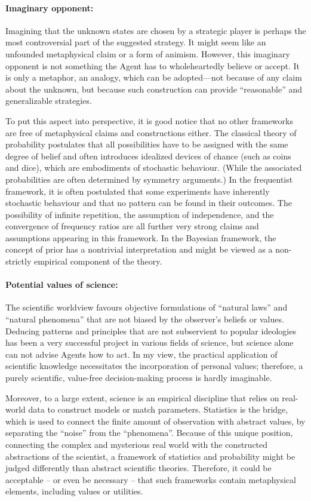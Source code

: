 \documentclass{article}
\begin{document}
\paragraph{Imaginary opponent:}
Imagining that the unknown states are chosen by a strategic player is perhaps the most controversial part of the suggested strategy. It might seem like an unfounded metaphysical claim or a form of animism. However, this imaginary opponent is not something the Agent has to wholeheartedly believe or accept. It is only a metaphor, an analogy, which can be adopted—not because of any claim about the unknown, but because such construction can provide ``reasonable'' and generalizable strategies.

To put this aspect into perspective, it is good notice that no other frameworks are free of metaphysical claims and constructions either.
The classical theory of probability postulates that all possibilities have to be assigned with the same degree of belief and often introduces idealized devices of chance (such as coins and dice), which are embodiments of stochastic behaviour. (While the associated probabilities are often determined by symmetry arguments.)
In the frequentist framework, it is often postulated that some experiments have inherently stochastic behaviour and that no pattern can be found in their outcomes. The possibility of infinite repetition, the assumption of independence, and the convergence of frequency ratios are all further very strong claims and assumptions appearing in this framework.
In the Bayesian framework, the concept of prior has a nontrivial interpretation and might be viewed as a non-strictly empirical component of the theory.

\paragraph{Potential values of science:}
The scientific worldview favours objective formulations of ``natural laws'' and ``natural phenomena'' that are not biased by the observer’s beliefs or values. Deducing patterns and principles that are not subservient to popular ideologies has been a very successful project in various fields of science, but science alone can not advise Agents how to act.
In my view, the practical application of scientific knowledge necessitates the incorporation of personal values; therefore, a purely scientific, value-free decision-making process is hardly imaginable.

Moreover, to a large extent, science is an empirical discipline that relies on real-world data to construct models or match parameters. Statistics is the bridge, which is used to connect the finite amount of observation with abstract values, by separating the ``noise'' from the ``phenomena''. Because of this unique position, connecting the complex and mysterious real world with the constructed abstractions of the scientist, a framework of statistics and probability might be judged differently than abstract scientific theories. Therefore, it could be acceptable – or even be necessary – that such frameworks contain metaphysical elements, including values or utilities. 
\end{document}
